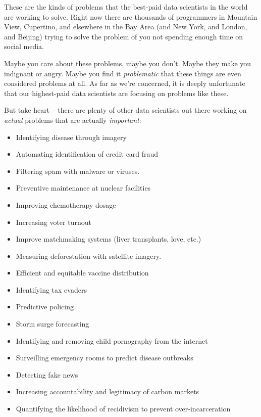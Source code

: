 \documentclass[]{book}
\providecommand{\tightlist}{%
  \setlength{\itemsep}{0pt}\setlength{\parskip}{0pt}}
\begin{document}
These are the kinds of problems that the best-paid data scientists in the world are working to solve. Right now there are thousands of programmers in Mountain View, Cupertino, and elsewhere in the Bay Area (and New York, and London, and Beijing) trying to solve the problem of you not spending enough time on social media.

Maybe you care about these problems, maybe you don't. Maybe they make you indignant or angry. Maybe you find it \emph{problematic} that these things are even considered problems at all. As far as we're concerned, it is deeply unfortunate that our highest-paid data scientists are focusing on problems like these.

But take heart -- there are plenty of other data scientists out there working on \emph{actual} problems that are actually \emph{important}:

\begin{itemize}
\tightlist
\item
  Identifying disease through imagery\\
\item
  Automating identification of credit card fraud\\
\item
  Filtering spam with malware or viruses.\\
\item
  Preventive maintenance at nuclear facilities\\
\item
  Improving chemotherapy dosage\\
\item
  Increasing voter turnout\\
\item
  Improve matchmaking systems (liver transplants, love, etc.)\\
\item
  Measuring deforestation with satellite imagery.\\
\item
  Efficient and equitable vaccine distribution\\
\item
  Identifying tax evaders\\
\item
  Predictive policing\\
\item
  Storm surge forecasting\\
\item
  Identifying and removing child pornography from the internet\\
\item
  Surveilling emergency rooms to predict disease outbreaks\\
\item
  Detecting fake news\\
\item
  Increasing accountability and legitimacy of carbon markets\\
\item
  Quantifying the likelihood of recidivism to prevent over-incarceration
\end{itemize}
\end{document}
